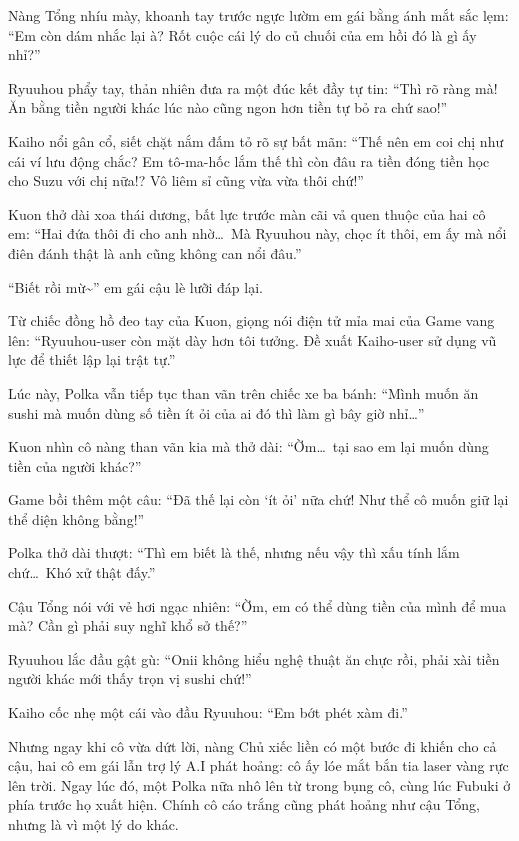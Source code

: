 \documentclass[../main.tex]{subfiles}
\begin{document}
Nàng Tổng nhíu mày, khoanh tay trước ngực lườm em gái bằng ánh mắt sắc lẹm: ``Em còn dám nhắc lại à? Rốt cuộc cái lý do củ chuối của em hồi đó là gì ấy nhỉ?''

Ryuuhou phẩy tay, thản nhiên đưa ra một đúc kết đầy tự tin: ``Thì rõ ràng mà! Ăn bằng tiền người khác lúc nào cũng ngon hơn tiền tự bỏ ra chứ sao!''

Kaiho nổi gân cổ, siết chặt nắm đấm tỏ rõ sự bất mãn: ``Thế nên em coi chị như cái ví lưu động chắc? Em tô-ma-hốc lắm thế thì còn đâu ra tiền đóng tiền học cho Suzu với chị nữa!? Vô liêm sỉ cũng vừa vừa thôi chứ!''

Kuon thở dài xoa thái dương, bất lực trước màn cãi vả quen thuộc của hai cô em: ``Hai đứa thôi đi cho anh nhờ\dots\ Mà Ryuuhou này, chọc ít thôi, em ấy mà nổi điên đánh thật là anh cũng không can nổi đâu.''

``Biết rồi mừ\~{}'' em gái cậu lè lưỡi đáp lại.

Từ chiếc đồng hồ đeo tay của Kuon, giọng nói điện tử mỉa mai của Game vang lên: ``Ryuuhou-user còn mặt dày hơn tôi tưởng. Đề xuất Kaiho-user sử dụng vũ lực để thiết lập lại trật tự.''

Lúc này, Polka vẫn tiếp tục than vãn trên chiếc xe ba bánh: ``Mình muốn ăn sushi mà muốn dùng số tiền ít ỏi của ai đó thì làm gì bây giờ nhỉ\dots''

Kuon nhìn cô nàng than vãn kia mà thở dài: ``Ờm\dots\ tại sao em lại muốn dùng tiền của người khác?''

Game bồi thêm một câu: ``Đã thế lại còn `ít ỏi' nữa chứ! Như thể cô muốn giữ lại thể diện không bằng!''

Polka thở dài thượt: ``Thì em biết là thế, nhưng nếu vậy thì xấu tính lắm chứ\dots\ Khó xử thật đấy.''

Cậu Tổng nói với vẻ hơi ngạc nhiên: ``Ờm, em có thể dùng tiền của mình để mua mà? Cần gì phải suy nghĩ khổ sở thế?''

Ryuuhou lắc đầu gật gù: ``Onii không hiểu nghệ thuật ăn chực rồi, phải xài tiền người khác mới thấy trọn vị sushi chứ!''

Kaiho cốc nhẹ một cái vào đầu Ryuuhou: ``Em bớt phét xàm đi.''

Nhưng ngay khi cô vừa dứt lời, nàng Chủ xiếc liền có một bước đi khiến cho cả cậu, hai cô em gái lẫn trợ lý A.I phát hoảng: cô ấy lóe mắt bắn tia laser vàng rực lên trời. Ngay lúc đó, một Polka nữa nhô lên từ trong bụng cô, cùng lúc Fubuki ở phía trước họ xuất hiện. Chính cô cáo trắng cũng phát hoảng như cậu Tổng, nhưng là vì một lý do khác.
\end{document}
